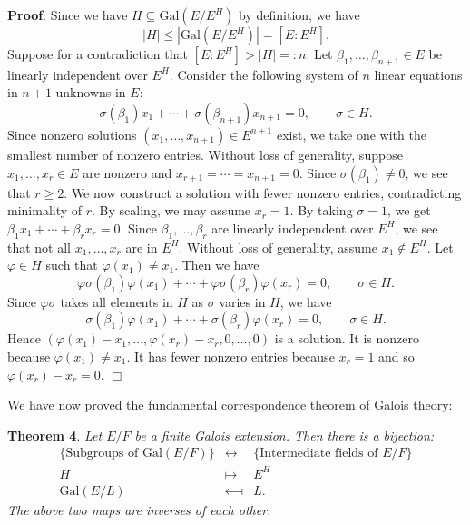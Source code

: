 \documentclass[12pt,letterpaper]{article}
\begin{document}
\noindent\textbf{Proof}: Since we have $H \subseteq \text{Gal}(E/E^H)$ by definition, we have
$$|H| \leq |\text{Gal}(E/E^H)| = [E:E^H].$$
Suppose for a contradiction that $[E:E^H] > |H| =: n$. Let $\beta_1,\ldots,\beta_{n+1}\in E$ be linearly independent over $E^H$. Consider the following system of $n$ linear equations in $n+1$ unknowns in $E$:
$$\sigma(\beta_1)x_1 + \cdots + \sigma(\beta_{n+1})x_{n+1} = 0,\qquad \sigma\in H.$$
Since nonzero solutions $(x_1,\ldots,x_{n+1})\in E^{n+1}$ exist, we take one with the smallest number of nonzero entries. Without loss of generality, suppose $x_1,\ldots,x_r\in E$ are nonzero and $x_{r+1} = \cdots = x_{n+1} = 0$. Since $\sigma(\beta_1)\neq 0$, we see that $r\geq 2$. We now construct a solution with fewer nonzero entries, contradicting minimality of $r$. By scaling, we may assume $x_r = 1$. By taking $\sigma = 1$, we get $\beta_1x_1 + \cdots + \beta_rx_r = 0$. Since $\beta_1,\ldots,\beta_r$ are linearly independent over $E^H$, we see that not all $x_1,\ldots,x_r$ are in $E^H$. Without loss of generality, assume $x_1\notin E^H$. Let $\varphi\in H$ such that $\varphi(x_1)\neq x_1$. Then we have
$$\varphi\sigma(\beta_1)\varphi(x_1) + \cdots + \varphi\sigma(\beta_r)\varphi(x_r) = 0,\qquad \sigma\in H.$$
Since $\varphi\sigma$ takes all elements in $H$ as $\sigma$ varies in $H$, we have
$$\sigma(\beta_1)\varphi(x_1) + \cdots + \sigma(\beta_r)\varphi(x_r) = 0,\qquad \sigma\in H.$$
Hence $(\varphi(x_1)-x_1,\ldots,\varphi(x_r) - x_r,0,\ldots,0)$ is a solution. It is nonzero because $\varphi(x_1)\neq x_1$. It has fewer nonzero entries because $x_r = 1$ and so $\varphi(x_r) - x_r = 0.$ $\Box$

We have now proved the fundamental correspondence theorem of Galois theory:

\noindent\textbf{Theorem 4}.
    \emph{Let $E/F$ be a finite Galois extension. Then there is a bijection:
    \begin{eqnarray*}
    \{\text{Subgroups of }\text{Gal}(E/F)\}&\longleftrightarrow&\{\text{Intermediate fields of }E/F\}\\
    H&\longmapsto& E^H\\
    \text{Gal}(E/L)&\longmapsfrom& L.
\end{eqnarray*}
The above two maps are inverses of each other.}
\end{document}
